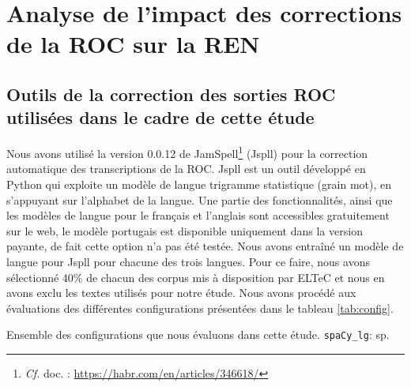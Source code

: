 
\section{Analyse de l'impact des corrections de la ROC sur la REN}
\label{sec:COR-OCR-IMPACT-NER}

\subsection{Outils de la correction des sorties ROC utilisées dans le cadre de cette étude}
\label{subsec:outils_COR-OCR-IMPACT-NER}
Nous avons utilisé la version 0.0.12 de JamSpell\footnote{\textit{Cf.} doc. : \url{https://habr.com/en/articles/346618/}} (Jspll) pour la correction automatique des transcriptions de la ROC. Jspll est un outil développé en Python qui exploite un modèle de langue trigramme statistique
 (grain mot), en s'appuyant sur l'alphabet de la langue. Une partie des fonctionnalités, ainsi que les modèles de langue pour le français et l'anglais sont accessibles gratuitement sur le web, le modèle portugais est disponible uniquement dans la version payante, de fait cette option n'a pas été testée.
Nous avons entraîné un modèle de langue pour Jspll pour chacune des trois langues. Pour ce faire, nous avons sélectionné 40\% de chacun des corpus mis à disposition par ELTeC
 et nous en avons exclu les textes utilisés pour notre étude. Nous avons procédé aux évaluations des différentes configurations présentées dans le tableau \ref{tab:config}.

\begin{table}[h!]
    \centering
   
    \caption{Ensemble des configurations que nous évaluons dans cette étude. \texttt{spaCy\_lg}: sp.}
    \label{tab:config}
\end{table}

